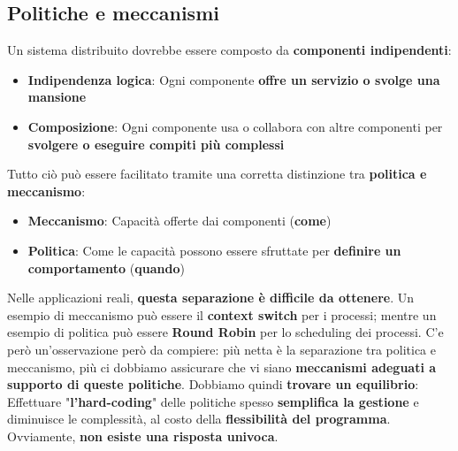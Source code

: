 \documentclass[12pt]{article}
\begin{document}
\subsection{Politiche e meccanismi}
Un sistema distribuito dovrebbe essere composto da \textbf{componenti indipendenti}:
\begin{itemize}
    \item \textbf{Indipendenza logica}: Ogni componente \textbf{offre un servizio o svolge una mansione}
    \item \textbf{Composizione}: Ogni componente usa o collabora con altre componenti per \textbf{svolgere o eseguire compiti più complessi}
\end{itemize}
Tutto ciò può essere facilitato tramite una corretta distinzione tra \textbf{politica e meccanismo}:
\begin{itemize}
    \item \textbf{Meccanismo}: Capacità offerte dai componenti (\textbf{come})
    \item \textbf{Politica}: Come le capacità possono essere sfruttate per \textbf{definire un comportamento} (\textbf{quando})
\end{itemize}
Nelle applicazioni reali, \textbf{questa separazione è difficile da ottenere}. Un esempio di meccanismo può essere il \textbf{context switch} per i processi; mentre un esempio di politica può essere \textbf{Round Robin} per lo scheduling dei processi. \newline
C'e però un'osservazione però da compiere: più netta è la separazione tra politica e meccanismo, più ci dobbiamo assicurare che vi siano \textbf{meccanismi adeguati a supporto di queste politiche}. Dobbiamo quindi \textbf{trovare un equilibrio}: Effettuare "\textbf{l'hard-coding}" delle politiche spesso \textbf{semplifica la gestione} e diminuisce le complessità, al costo della \textbf{flessibilità del programma}. Ovviamente, \textbf{non esiste una risposta univoca}.
\end{document}
